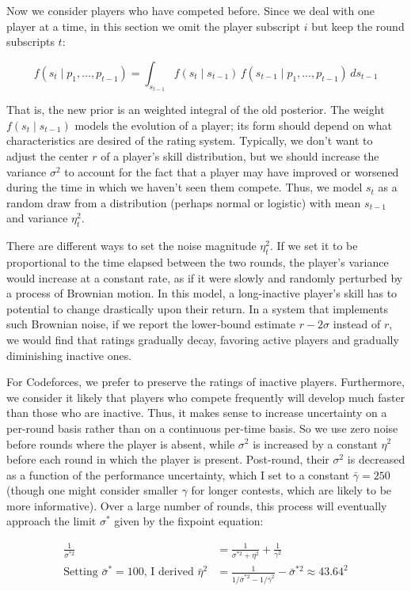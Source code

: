 \documentclass{article}
\begin{document}
Now we consider players who have competed before. Since we deal with one player at a time, in this section we omit the player subscript $i$ but keep the round subscripts $t$:

\[
f(s_t \mid p_1,\ldots,p_{t-1})
= \int_{s_{t-1}} f(s_t \mid s_{t-1}) \, f(s_{t-1} \mid p_1,\ldots,p_{t-1}) \,ds_{t-1}
\]

That is, the new prior is an weighted integral of the old posterior. The weight $f(s_t \mid s_{t-1})$ models the evolution of a player; its form should depend on what characteristics are desired of the rating system. Typically, we don't want to adjust the center $r$ of a player's skill distribution, but we should increase the variance $\sigma^2$ to account for the fact that a player may have improved or worsened during the time in which we haven't seen them compete. Thus, we model $s_t$ as a random draw from a distribution (perhaps normal or logistic) with mean $s_{t-1}$ and variance $\eta_t^2$.

There are different ways to set the noise magnitude $\eta_t^2$. If we set it to be proportional to the time elapsed between the two rounds, the player's variance would increase at a constant rate, as if it were slowly and randomly perturbed by a process of Brownian motion. In this model, a long-inactive player's skill has to potential to change drastically upon their return. In a system that implements such Brownian noise, if we report the lower-bound estimate $r-2\sigma$ instead of $r$, we would find that ratings gradually decay, favoring active players and gradually diminishing inactive ones.

For Codeforces, we prefer to preserve the ratings of inactive players. Furthermore, we consider it likely that players who compete frequently will develop much faster than those who are inactive. Thus, it makes sense to increase uncertainty on a per-round basis rather than on a continuous per-time basis. So we use zero noise before rounds where the player is absent, while $\sigma^2$ is increased by a constant $\eta^2$ before each round in which the player is present. Post-round, their $\sigma^2$ is decreased as a function of the performance uncertainty, which I set to a constant $\bar\gamma = 250$ (though one might consider smaller $\gamma$ for longer contests, which are likely to be more informative). Over a large number of rounds, this process will eventually approach the limit $\sigma^*$ given by the fixpoint equation:

\begin{align*}
\frac{1}{\sigma^{*2}} &= \frac{1}{\sigma^{*2} + \eta^2} + \frac{1}{\gamma^2}
\\ \text{Setting }\bar\sigma^*=100\text{, I derived }\bar\eta^2 &= \frac{1}{1/\bar\sigma^{*2} - 1/\bar\gamma^2} - \bar\sigma^{*2} \approx 43.64^2
\end{align*}
\end{document}
